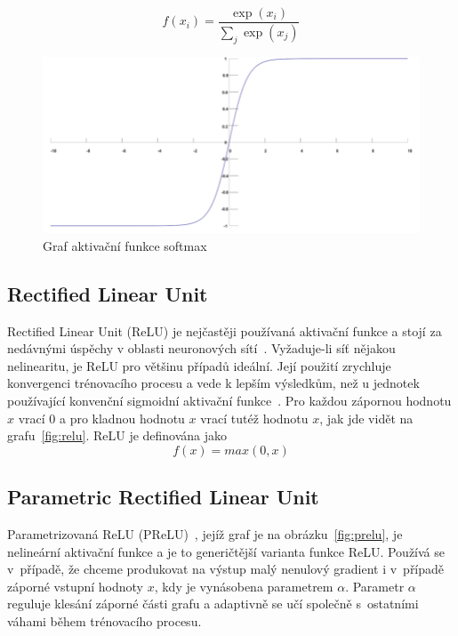 \begin{equation}
  f(x_i) = \frac{\exp(x_i)}{\sum_j \exp(x_j)}
\end{equation}


\begin{figure}[H]
    \centering
    \includegraphics[scale=0.35]{obrazky-figures/softmax.png}
    \caption{\label{fig:softmax}Graf aktivační funkce softmax}
\end{figure}



\subsection*{Rectified Linear Unit}
\label{relu}
Rectified Linear Unit (ReLU) je nejčastěji používaná aktivační funkce a stojí za nedávnými úspěchy v oblasti neuronových sítí~\cite{NIPS2012_4824}. Vyžaduje-li síť nějakou nelinearitu, je ReLU pro většinu případů ideální. Její použití zrychluje konvergenci trénovacího procesu a vede k lepším výsledkům, než u jednotek používající konvenční sigmoidní aktivační funkce~\cite{40811}. Pro každou zápornou hodnotu $x$ vrací $0$ a pro kladnou hodnotu $x$ vrací tutéž hodnotu $x$, jak jde vidět na grafu~\ref{fig:relu}. ReLU je definována jako 
\begin{equation}
   f(x)=max(0,x)
\end{equation}




\subsection*{Parametric Rectified Linear Unit}
Parametrizovaná ReLU (PReLU)~\cite{he2015delving}, jejíž graf je na obrázku~\ref{fig:prelu}, je nelineární aktivační funkce a je to generičtější varianta funkce ReLU. Používá se v~případě, že chceme produkovat na výstup malý nenulový gradient i v~případě záporné vstupní hodnoty $x$, kdy je vynásobena parametrem $\alpha$. Parametr $\alpha$ reguluje klesání záporné části grafu a adaptivně se učí společně s~ostatními váhami během trénovacího procesu.

